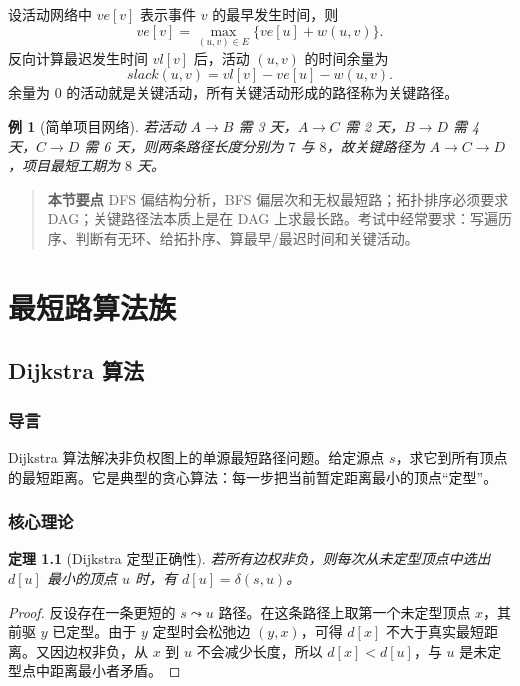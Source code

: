 \documentclass[UTF8,oneside,12pt]{ctexbook}
\newtheorem{theorem}{定理}[chapter]
\newtheorem{example}{例}[chapter]
\newenvironment{summarybox}{\begin{quote}\small\noindent\textbf{本节要点}\quad}{\end{quote}}
\begin{document}
设活动网络中 $ve[v]$ 表示事件 $v$ 的最早发生时间，则
\[
ve[v]=\max_{(u,v)\in E}\{ve[u]+w(u,v)\}.
\]
反向计算最迟发生时间 $vl[v]$ 后，活动 $(u,v)$ 的时间余量为
\[
slack(u,v)=vl[v]-ve[u]-w(u,v).
\]
余量为 $0$ 的活动就是关键活动，所有关键活动形成的路径称为关键路径。

\begin{example}[简单项目网络]
若活动 $A\to B$ 需 3 天，$A\to C$ 需 2 天，$B\to D$ 需 4 天，$C\to D$ 需 6 天，则两条路径长度分别为 $7$ 与 $8$，故关键路径为 $A\to C\to D$，项目最短工期为 $8$ 天。
\end{example}

\begin{summarybox}
DFS 偏结构分析，BFS 偏层次和无权最短路；拓扑排序必须要求 DAG；关键路径法本质上是在 DAG 上求最长路。考试中经常要求：写遍历序、判断有无环、给拓扑序、算最早/最迟时间和关键活动。
\end{summarybox}

\chapter{最短路算法族}
\section{Dijkstra 算法}
\subsection{导言}
Dijkstra 算法解决非负权图上的单源最短路径问题。给定源点 $s$，求它到所有顶点的最短距离。它是典型的贪心算法：每一步把当前暂定距离最小的顶点“定型”。

\subsection{核心理论}
\begin{theorem}[Dijkstra 定型正确性]
若所有边权非负，则每次从未定型顶点中选出 $d[u]$ 最小的顶点 $u$ 时，有 $d[u]=\delta(s,u)$。
\end{theorem}
\begin{proof}
反设存在一条更短的 $s\leadsto u$ 路径。在这条路径上取第一个未定型顶点 $x$，其前驱 $y$ 已定型。由于 $y$ 定型时会松弛边 $(y,x)$，可得 $d[x]$ 不大于真实最短距离。又因边权非负，从 $x$ 到 $u$ 不会减少长度，所以 $d[x]<d[u]$，与 $u$ 是未定型点中距离最小者矛盾。
\end{proof}
\end{document}
